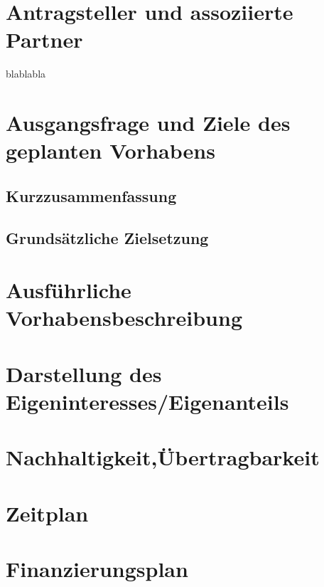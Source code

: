\documentclass{article}
\begin{document}
\renewcommand{\thesection}{2}
\section{Antragsteller und assoziierte Partner}
blablabla

\renewcommand{\thesection}{3}
\section{Ausgangsfrage und Ziele des geplanten Vorhabens}
\subsection{Kurzzusammenfassung}
\subsection{Grundsätzliche Zielsetzung}
%
\renewcommand{\thesection}{4}
\section{Ausführliche Vorhabensbeschreibung}

\renewcommand{\thesection}{5}
\section{Darstellung des Eigeninteresses/Eigenanteils}


\renewcommand{\thesection}{6}
\section{Nachhaltigkeit,Übertragbarkeit}

\renewcommand{\thesection}{7}
\section{Zeitplan}

\renewcommand{\thesection}{8}
\section{Finanzierungsplan}


\renewcommand{\refname}{}


%
\end{document}
